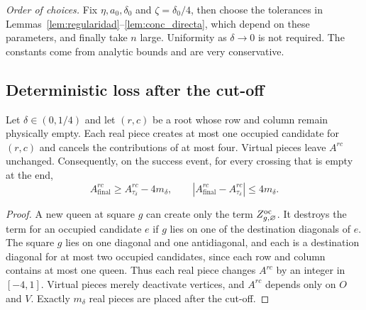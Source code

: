 \emph{Order of choices.} Fix $\eta,a_0,\delta_0$ and $\zeta=\delta_0/4$, then choose the tolerances in
Lemmas~\ref{lem:regularidad}--\ref{lem:conc_directa}, which depend on these parameters, and finally take $n$
large. Uniformity as
$\delta\to0$ is not required. The constants come from analytic bounds and are very conservative.

\subsection{Deterministic loss after the cut-off}

\begin{lema}\label{lem:perdida} Let $\delta\in(0,1/4)$ and let $(r,c)$ be a root whose row and column remain
physically empty. Each
real piece creates at most one occupied candidate for $(r,c)$ and cancels the contributions of at most four.
Virtual pieces leave
$A^{rc}$ unchanged. Consequently, on the success event, for every crossing that is empty at the end, \[
 A^{rc}_{\mathrm{final}}\ge A^{rc}_{\tau_\delta}-4m_\delta,\qquad
 |A^{rc}_{\mathrm{final}}-A^{rc}_{\tau_\delta}|\le4m_\delta .
\] \end{lema}

\begin{proof} A new queen at square $g$ can create only the term $Z^{\mathrm{oc}}_{g,\varnothing}$. It destroys the
term for an occupied
candidate $e$ if $g$ lies on one of the destination diagonals of $e$. The square $g$ lies on one diagonal
and one antidiagonal, and each is
a destination diagonal for at most two occupied candidates, since each row and column contains at most one
queen. Thus each real
piece changes $A^{rc}$ by an integer in $[-4,1]$. Virtual pieces merely
deactivate vertices, and $A^{rc}$ depends only on $O$ and $V$. Exactly $m_\delta$ real pieces are placed
after the cut-off. \end{proof}
